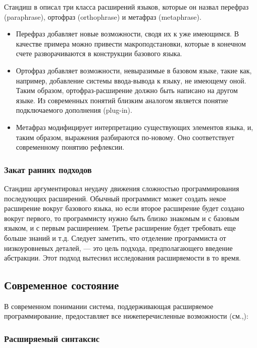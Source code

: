 \documentclass[a4paper,12pt,titlepage]{extarticle}
\begin{document}
Стандиш в \cite{Stan75} описал три класса расширений языков, которые он назвал
перефраз (paraphrase), ортофраз (orthophrase) и метафраз (metaphrase).
\begin{itemize}
  \item Перефраз добавляет новые возможности, сводя их к уже имеющимся. В
  качестве примера можно привести макроподстановки, которые в конечном счете
  разворачиваются в конструкции базового языка.
  \item Ортофраз добавляет возможности, невыразимые в базовом языке, такие как,
  например, добавление системы ввода-вывода к языку, не имеющему оной. Таким
  образом, ортофраз-расширение должно быть написано на другом языке. Из
  современных понятий близким аналогом является понятие подключаемого дополнения
  (plug-in).
  \item Метафраз модифицирует интерпретацию существующих элементов языка, и,
  таким образом, выражения разбираются по-новому. Оно соответствует
  современному понятию рефлексии.
\end{itemize}

\subsubsection*{Закат ранних подходов}

Стандиш аргументировал неудачу движения сложностью программирования последующих
расширений. Обычный программист может создать некое расширение вокруг базового
языка, но если второе расширение будет создано вокруг первого, то программисту
нужно быть близко знакомым и с базовым языком, и с первым расширением. Третье
расширение будет требовать еще больше знаний и т.д. Следует заметить, что
отделение программиста от низкоуровневых деталей, --- это цель подхода,
предполагающего введение абстракции. Этот подход вытеснил исследования
расширяемости в то время.

\subsection{Современное состояние}
\label{modernextsys}

В современном понимании система, поддерживающая расширяемое программирование,
предоставляет все нижеперечисленные возможности
(см.\cite{extlangwiki},\cite{Ext2105}):

\subsubsection*{Расширяемый синтаксис}
\end{document}

